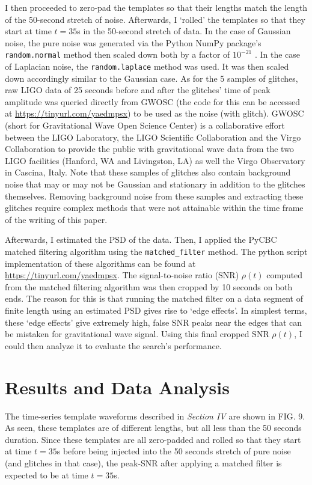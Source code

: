 \documentclass[reprint,
letterpaper,
 amsmath,amssymb,
 aps,
]{revtex4-2}
\def\code#1{\texttt{#1}}
\begin{document}
I then proceeded to zero-pad the templates so that their lengths match the length of the 50-second stretch of noise. Afterwards, I `rolled' the templates so that they start at time $t=35$s in the 50-second stretch of data. In the case of Gaussian noise, the pure noise was generated via the Python NumPy package's \code{random.normal} method then scaled down both by a factor of $10^{-21}$ \cite{numpy}. In the case of Laplacian noise, the \code{random.laplace} method was used. It was then scaled down accordingly similar to the Gaussian case. As for the 5 samples of glitches, raw LIGO data of 25 seconds before and after the glitches' time of peak amplitude was queried directly from GWOSC (the code for this can be accessed at \url{https://tinyurl.com/yaedmpsx}) to be used as the noise (with glitch). GWOSC (short for Gravitational Wave Open Science Center) is a collaborative effort between the LIGO Laboratory, the LIGO Scientific Collaboration and the Virgo Collaboration to provide the public with gravitational wave data from the two LIGO facilities (Hanford, WA and Livingston, LA) as well the Virgo Observatory in Cascina, Italy. Note that these samples of glitches also contain background noise that may or may not be Gaussian and stationary in addition to the glitches themselves. Removing background noise from these samples and extracting these glitches require complex methods that were not attainable within the time frame of the writing of this paper. 

Afterwards, I estimated the PSD of the data. Then, I applied the PyCBC matched filtering algorithm using the \code{matched\_filter} method. The python script implementation of these algorithms can be found at \url{https://tinyurl.com/yaedmpsx}. The signal-to-noise ratio (SNR) $\rho (t)$ computed from the matched filtering algorithm was then cropped by 10 seconds on both ends. The reason for this is that running the matched filter on a data segment of finite length using an estimated PSD gives rise to `edge effects'. In simplest terms, these `edge effects' give extremely high, false SNR peaks near the edges that can be mistaken for gravitational wave signal. Using this final cropped SNR $\rho(t)$, I could then analyze it to evaluate the search's performance.

\section{Results and Data Analysis}
The time-series template waveforms described in \textit{Section IV} are shown in FIG. 9. As seen, these templates are of different lengths, but all less than the 50 seconds duration. Since these templates are all zero-padded and rolled so that they start at time $t=35$s before being injected into the 50 seconds stretch of pure noise (and glitches in that case), the peak-SNR after applying a matched filter is expected to be at time $t=35$s.
\end{document}
